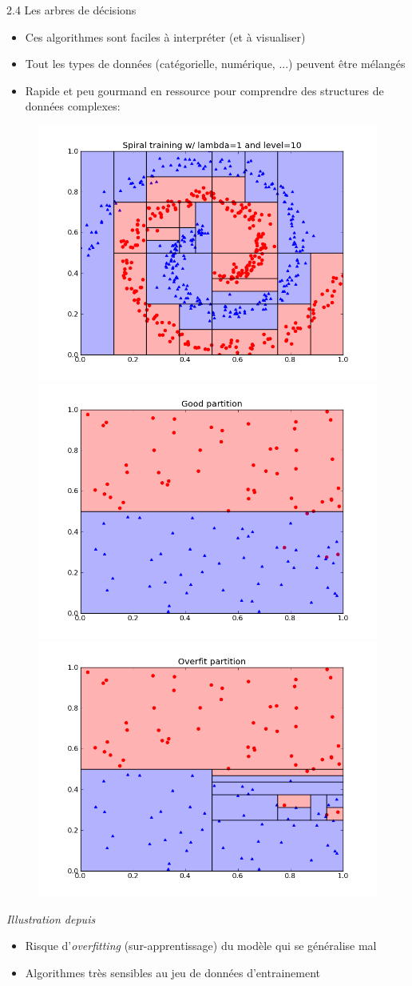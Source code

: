 \begin{frame}{2.4 Les arbres de décisions}
  \begin{itemize}
  \item Ces algorithmes sont faciles à interpréter (et à visualiser)
  \item Tout les types de données (catégorielle, numérique, ...) peuvent être mélangés
  \item Rapide et peu gourmand en ressource pour comprendre des structures de données complexes:
  \end{itemize}
  \begin{figure}
    \includegraphics[trim={0 0 0 40},clip,width=.3\textwidth]{fig/spiralDTresult.png}
    \includegraphics[trim={0 0 0 40},clip,width=.3\textwidth]{fig/goodPartitionDT.png}
    \includegraphics[trim={0 0 0 40},clip,width=.3\textwidth]{fig/overfittingPartitionDT.png}
  \end{figure}
  \vspace{-1cm}
  \begin{center}
    \scriptsize
    \textit{Illustration depuis \href{https://www.classes.cs.uchicago.edu/archive/2013/winter/12200-1/assignments/pa4/index.html}{\color{blue}{University of Chicago}}}
  \end{center}
  \begin{itemize}
  \item Risque d'\textit{overfitting} (sur-apprentissage) du modèle qui se généralise mal
  \item Algorithmes très sensibles au jeu de données d'entrainement
  \end{itemize}
\end{frame}

